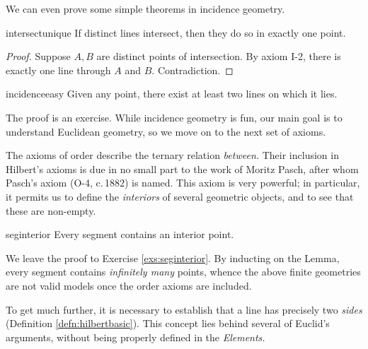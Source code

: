 We can even prove some simple theorems in incidence geometry.

\begin{lemm}{}{intersectunique}
	If distinct lines intersect, then they do so in exactly one point.
\end{lemm}

\begin{proof}
	Suppose $A,B$ are distinct points of intersection. By axiom I-2, there is exactly one line through $A$ and $B$. Contradiction.
\end{proof}

\begin{lemm}{}{incidenceeasy}
	Given any point, there exist at least two lines on which it lies.
\end{lemm}

The proof is an exercise. While incidence geometry is fun, our main goal is to understand Euclidean geometry, so we move on to the next set of axioms.



The axioms of order describe the ternary relation \emph{between.} Their inclusion in Hilbert's axioms is due in no small part to the work of Moritz Pasch, after whom Pasch's axiom (O-4, c.\,1882) is named. This axiom is very powerful; in particular, it permits us to define the \emph{interiors} of several geometric objects, and to see that these are non-empty.

\begin{lemm}{}{seginterior}
	Every segment contains an interior point.
\end{lemm}

We leave the proof to Exercise \ref{exs:seginterior}. By inducting on the Lemma, every segment contains \emph{infinitely many} points, whence the above finite geometries are not valid models once the order axioms are included.

\goodbreak

To get much further, it is necessary to establish that a line has precisely two \emph{sides} (Definition \ref{defn:hilbertbasic}). This concept lies behind several of Euclid's arguments, without being properly defined in the \emph{Elements.}


